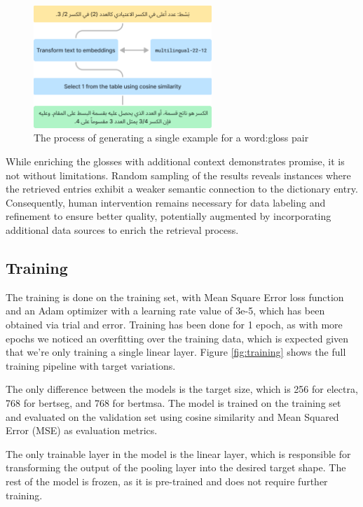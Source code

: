 \documentclass[15pt]{article}
\begin{document}
\begin{figure}[H]
    \centering
    \captionsetup{justification=centering}
    \includegraphics[width=0.6\textwidth]{examples-generation.png}
    \caption{The process of generating a single example for a word:gloss pair}
    \label{fig:examples-generation}
\end{figure}

While enriching the glosses with additional context demonstrates promise, it is not without limitations. Random sampling of the results reveals instances where the retrieved entries exhibit a weaker semantic connection to the dictionary entry. Consequently, human intervention remains necessary for data labeling and refinement to ensure better quality, potentially augmented by incorporating additional data sources to enrich the retrieval process.

\subsection{Training}

The training is done on the training set, with Mean Square Error loss function and an Adam optimizer with a learning rate value of 3e-5, which has been obtained via trial and error. Training has been done for 1 epoch, as with more epochs we noticed an overfitting over the training data, which is expected given that we’re only training a single linear layer. Figure \ref{fig:training} shows the full training pipeline with target variations.

The only difference between the models is the target size, which is 256 for electra, 768 for bertseg, and 768 for bertmsa. The model is trained on the training set and evaluated on the validation set using cosine similarity and Mean Squared Error (MSE) as evaluation metrics.

The only trainable layer in the model is the linear layer, which is responsible for transforming the output of the pooling layer into the desired target shape. The rest of the model is frozen, as it is pre-trained and does not require further training.
\end{document}
